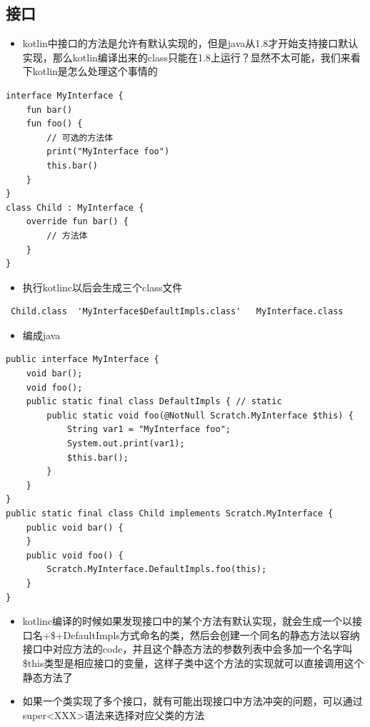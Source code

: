 \documentclass[9pt, b5paper]{article}
\begin{document}
\subsection{接口}
\label{sec-7-6}
\begin{itemize}
\item kotlin中接口的方法是允许有默认实现的，但是java从1.8才开始支持接口默认实现，那么kotlin编译出来的class只能在1.8上运行？显然不太可能，我们来看下kotlin是怎么处理这个事情的
\end{itemize}
\begin{verbatim}
interface MyInterface {
    fun bar()
    fun foo() {
        // 可选的方法体
        print("MyInterface foo")
        this.bar()
    }
}
class Child : MyInterface {
    override fun bar() {
        // 方法体
    }
}
\end{verbatim}
\begin{itemize}
\item 执行kotlinc以后会生成三个class文件
\end{itemize}
\begin{verbatim}
 Child.class  'MyInterface$DefaultImpls.class'   MyInterface.class
\end{verbatim}
\begin{itemize}
\item 编成java
\end{itemize}
\begin{verbatim}
public interface MyInterface {
    void bar();
    void foo();
    public static final class DefaultImpls { // static
        public static void foo(@NotNull Scratch.MyInterface $this) {
            String var1 = "MyInterface foo";
            System.out.print(var1);
            $this.bar();
        }
    }
}
public static final class Child implements Scratch.MyInterface {
    public void bar() {
    }
    public void foo() {
        Scratch.MyInterface.DefaultImpls.foo(this);
    }
}
\end{verbatim}
\begin{itemize}
\item kotlinc编译的时候如果发现接口中的某个方法有默认实现，就会生成一个以接口名+\$+DefaultImpls方式命名的类，然后会创建一个同名的静态方法以容纳接口中对应方法的code，并且这个静态方法的参数列表中会多加一个名字叫\$this类型是相应接口的变量，这样子类中这个方法的实现就可以直接调用这个静态方法了
\item 如果一个类实现了多个接口，就有可能出现接口中方法冲突的问题，可以通过super<XXX>语法来选择对应父类的方法
\end{itemize}
\end{document}
